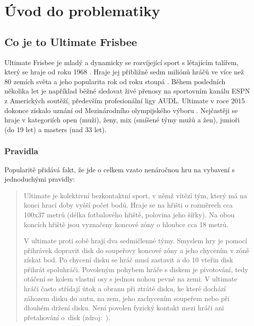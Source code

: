 \chapter{Úvod do problematiky}

\section{Co je to Ultimate Frisbee}

Ultimate Frisbee je mladý a dynamicky se rozvíjející sport s létajícím talířem,
který se hraje od roku 1968 \cite{cald-ultimate}. Hraje jej přibližně sedm miliónů
hráčů ve více než 80 zemích světa a jeho popularita rok od roku stoupá \cite{usa-ultimate}.
Během posledních několika let je například běžné sledovat živé přenosy na sportovním kanálu ESPN
z Amerických soutěží, především profesionální ligy AUDL. Ultimate v roce 2015 dokonce získalo
uznání od Mezinárodního olympijského výboru \cite{cald-uznani}. Nejčastěji se hraje v kategoriích
open (muži), ženy, mix (smíšené týmy mužů a žen), junioři (do 19 let) a masters (nad 33 let).

\subsection{Pravidla}

Popularitě přidává fakt, že jde o celkem vzato nenáročnou hru na vybavení s jednoduchými pravidly:

\begin{quote}
Ultimate je kolektivní bezkontaktní sport, v němž vítězí tým, který má na konci hrací doby
vyšší počet bodů. Hraje se na hřišti o rozměrech cca 100x37 metrů (délka fotbalového hřiště,
polovina jeho šířky). Na obou koncích hřiště jsou vyznačeny koncové zóny o hloubce cca 18 metrů.

V ultimate proti sobě hrají dva sedmičlenné týmy. Smyslem hry je pomocí přihrávek dopravit disk
do soupeřovy koncové zóny a jeho chycením v zóně získat bod. Po chycení disku se hráč musí
zastavit a do 10 vteřin disk přihrát spoluhráči. Povoleným pohybem hráče s diskem je pivotování,
tedy otáčení se kolem vlastní osy s jednou nohou pevně na zemi. V ultimate hráči často střídají
útok a obranu při ztrátě disku, ke které dochází záhozem disku do autu, na zem, jeho zachycením
soupeřem nebo při dlouhém držení disku. Není povolen fyzický kontakt mezi hráči ani přetahování
o~disk (zdroj:~\cite{cald-ultimate}).
\end{quote}

